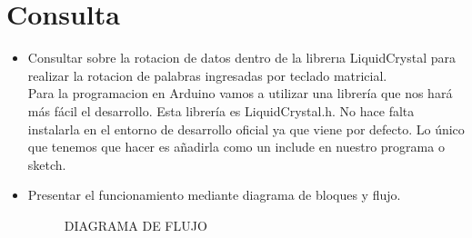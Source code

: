 \documentclass[10pt,a4paper]{article}
\begin{document}
\section{Consulta}
\begin{itemize}
\item Consultar sobre la rotacion de datos dentro de la librerıa LiquidCrystal para realizar la rotacion de palabras ingresadas por teclado matricial.
\\Para la programacion en Arduino vamos a utilizar una librería que nos hará más fácil el desarrollo. Esta librería es LiquidCrystal.h. No hace falta instalarla en el entorno de desarrollo oficial ya que viene por defecto. Lo único que tenemos que hacer es añadirla como un include en nuestro programa o sketch. 
\end{itemize}
\begin{itemize}
\item Presentar el funcionamiento mediante diagrama de bloques y flujo.
\begin{figure}[hb]
\centering
\caption{DIAGRAMA DE FLUJO}

\end{figure}
\end{itemize}
\end{document}
